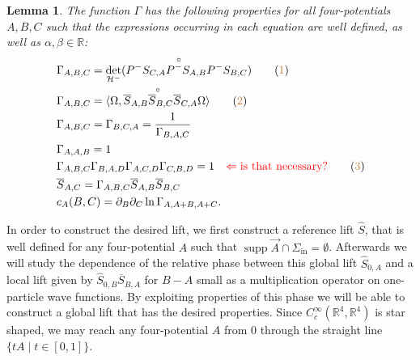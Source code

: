 \documentclass[a4paper,11pt]{article}
\newtheorem{lem}{Lemma}
\newcommand{\supp}{\operatorname{supp}}
\begin{document}
\begin{lem}\label{gamma attri}
The function \(\Gamma\) has the following properties for all four-potentials \(A,B,C\) such that the expressions occurring in each equation are well defined,
as well as \(\alpha, \beta \in \mathbb{R}\):
\begin{align}\label{gamma attri1}
&\Gamma_{A,B,C}=\overset{\circ}{\det_{\mathcal{H}^-} (P^- S_{C,A} P^- S_{A,B} P^- S_{B,C})}\tag{\textcolor{brown}{1}}\\\label{gamma attri2}
&\Gamma_{A,B,C}=\overset{\circ}{ \langle \Omega, \overline{S}_{A,B} \overline{S}_{B,C} \overline{S}_{C,A}\Omega\rangle }\tag{\textcolor{brown}{2}}\\\label{gamma attri3}
&\Gamma_{A,B,C}=\Gamma_{B,C,A}=\frac{1}{\Gamma_{B,A,C}}\\\label{gamma attri4}
&\Gamma_{A,A,B}=1\\\label{gamma attri5}
&\Gamma_{A,B,C}\Gamma_{B,A,D}\Gamma_{A,C,D}\Gamma_{C,B,D}=1 \quad \textcolor{red}{\Leftarrow\mathrm{is\,\, that\,\, necessary?}}\tag{\textcolor{brown}{3}}\\\label{gamma attri6}
&\overline{S}_{A,C}=\Gamma_{A,B,C}\overline{S}_{A,B}\overline{S}_{B,C}\\\label{gamma attri7}
&c_A(B,C)=\partial_B \partial_C \ln \Gamma_{A,A+B,A+C}.
\end{align}
\end{lem}

In order to construct the desired lift, we first construct a reference lift \(\hat{S}\), that is well defined for any four-potential \(A\) 
such that \(\supp \vec{A} \cap \Sigma_{\mathrm{in}} = \emptyset \). Afterwards we will study the dependence of the relative phase between 
this global lift \(\hat{S}_{0,A}\) and a local lift given by \(\hat{S}_{0,B}\overline{S}_{B,A}\) for \(B-A\) small as a multiplication operator 
on one-particle wave functions. By exploiting properties of this phase we will be able to construct a global lift that has the desired properties.
Since \(C_c^\infty(\mathbb{R}^4,\mathbb{R}^4)\) is star shaped, we may reach any four-potential \(A\) from \(0\) through the straight line
\(\{t A\mid t \in [0,1]\}\). 
\end{document}
